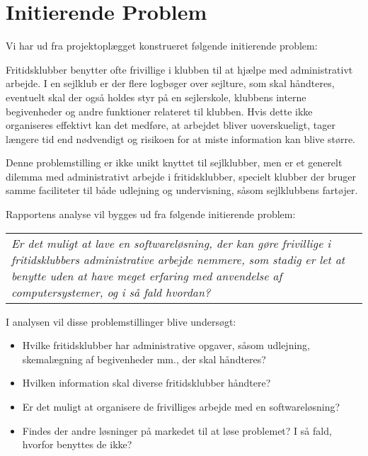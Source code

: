\section{Initierende Problem}
Vi har ud fra projektoplægget konstrueret følgende initierende problem: 

Fritidsklubber benytter ofte frivillige i klubben til at hjælpe med administrativt arbejde. \citep{Frivilligrapporten}
I en sejlklub er der flere logbøger over sejlture, som skal håndteres, eventuelt skal der også holdes styr på en sejlerskole, klubbens interne begivenheder og andre funktioner relateret til klubben. 
Hvis dette ikke organiseres effektivt kan det medføre, at arbejdet bliver uoverskueligt, tager længere tid end nødvendigt og risikoen for at miste information kan blive større.

Denne problemstilling er ikke unikt knyttet til sejlklubber, men er et generelt dilemma med administrativt arbejde i fritidsklubber, specielt klubber der bruger samme faciliteter til både udlejning og undervisning, såsom sejlklubbens fartøjer.  

Rapportens analyse vil bygges ud fra følgende initierende problem:
\begin{center}
  \begin{tabular}{|p{14cm}|}
	\textit{Er det muligt at lave en softwareløsning, der kan gøre frivillige i fritidsklubbers administrative
	arbejde nemmere, som stadig er let at benytte uden at have meget erfaring med anvendelse af computersystemer, og i så fald hvordan?}
  \end{tabular}
\end{center}

I analysen vil disse problemstillinger blive undersøgt:

\begin{itemize}
  \item Hvilke fritidsklubber har administrative opgaver, såsom udlejning, skemalægning af begivenheder mm., der
        skal håndteres?
  \item Hvilken information skal diverse fritidsklubber håndtere?
  \item Er det muligt at organisere de frivilliges arbejde med en softwareløsning?
  \item Findes der andre løsninger på markedet til at løse problemet? I så fald, hvorfor benyttes de ikke?
\end{itemize}